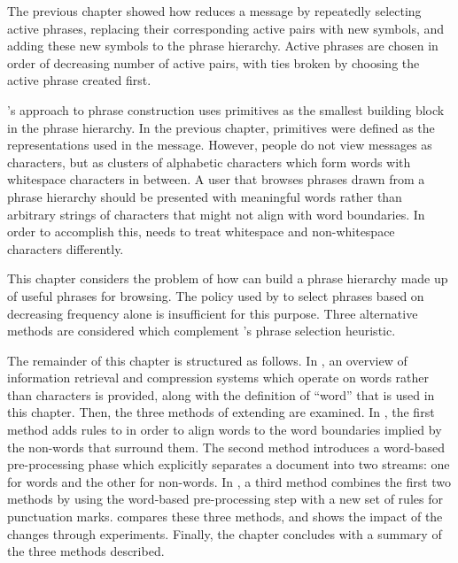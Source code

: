 
The previous chapter showed how \repair reduces a message by
repeatedly selecting active phrases, replacing their corresponding
active pairs with new symbols, and adding these new symbols
to the phrase hierarchy.  Active phrases are chosen in order of
decreasing number of active pairs, with ties broken by choosing
the active phrase created first.

\repair's approach to phrase construction uses primitives as the
smallest building block in the phrase hierarchy.
In the previous chapter, primitives were defined as
the \eascii representations used in the message.  However, 
people do not view messages as characters, but as clusters of
alphabetic characters which form words with 
whitespace characters in between.
A user that browses phrases drawn
from a \repair phrase hierarchy should be presented with 
meaningful words rather than arbitrary strings of characters that 
might not align with word boundaries.  In order to accomplish
this, \repair needs to treat whitespace and non-whitespace
characters differently.

This chapter considers the problem of how \repair can build a
phrase hierarchy made up of useful phrases for
browsing.  The policy used by \repair to select phrases based on
decreasing frequency alone is insufficient for this purpose.
Three alternative methods are considered which complement
\repair's phrase selection heuristic.  

The remainder of this chapter is structured as follows.  
In , an overview of information
retrieval and compression systems which operate on words rather
than characters is provided, along with the definition of ``word''
that is used in this chapter.
Then, the three methods of extending
\repair are examined.  In ,
the first method adds rules to \repair in order to align words 
to the word boundaries implied by the non-words that 
surround them.  The second method introduces
a word-based pre-processing phase which explicitly separates a
document into two streams:  one for words and the other for non-words.
In , a third method combines the first two
methods by using the word-based pre-processing step with a
new set of rules for punctuation marks.
 compares these three methods, and shows the
impact of the changes through experiments.
Finally, the chapter 
concludes with a summary of the three methods described.

